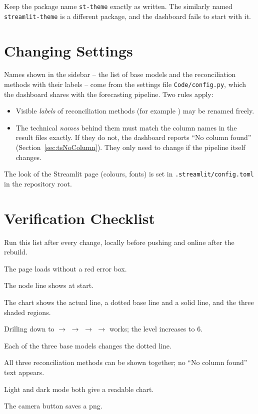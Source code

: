 \begin{WarningBox}
Keep the package name \texttt{st-theme} exactly as written. The similarly named \texttt{streamlit-theme} is a different package, and the dashboard fails to start with it.
\end{WarningBox}

\section{Changing Settings}
\label{sec:mtConfig}

Names shown in the sidebar -- the list of base models and the reconciliation methods with their labels -- come from the settings file \texttt{Code/config.py}, which the dashboard shares with the forecasting pipeline. Two rules apply:
\begin{itemize}
  \item Visible \emph{labels} of reconciliation methods (for example ) may be renamed freely.
  \item The technical \emph{names} behind them must match the column names in the result files exactly. If they do not, the dashboard reports ``No column found'' (Section~\ref{sec:tsNoColumn}). They only need to change if the pipeline itself changes.
\end{itemize}

The look of the Streamlit page (colours, fonts) is set in \texttt{.streamlit/config.toml} in the repository root.

\section{Verification Checklist}
\label{sec:mtVerify}

Run this list after every change, locally before pushing and online after the rebuild.

\begin{todolist}
  \item The page loads without a red error box.
  \item The node line shows  at start.
  \item The chart shows the actual line, a dotted base line and a solid  line, and the three shaded regions.
  \item Drilling down to  $\rightarrow$  $\rightarrow$  $\rightarrow$  $\rightarrow$  works; the level increases to 6.
  \item Each of the three base models changes the dotted line.
  \item All three reconciliation methods can be shown together; no ``No column found'' text appears.
  \item Light and dark mode both give a readable chart.
  \item The camera button saves a \ac{png}.
\end{todolist}

